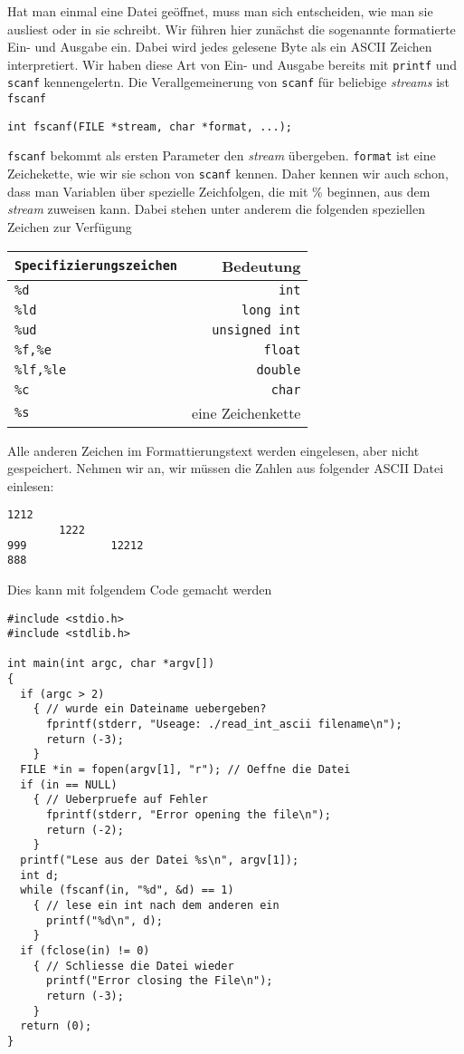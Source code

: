 Hat man einmal eine Datei geöffnet, muss man sich entscheiden, wie man sie ausliest oder in sie schreibt.
Wir führen hier zunächst die sogenannte formatierte Ein- und Ausgabe ein.
Dabei wird jedes gelesene Byte als ein ASCII Zeichen interpretiert.
Wir haben diese Art von Ein- und Ausgabe bereits mit \verb|printf| und \verb|scanf| kennengelertn.
Die Verallgemeinerung von \verb|scanf| für beliebige \emph{streams} ist \verb|fscanf|
\begin{lstlisting}
int fscanf(FILE *stream, char *format, ...);
\end{lstlisting}
\verb|fscanf| bekommt als ersten Parameter den \emph{stream} übergeben.
\verb|format| ist eine Zeichekette, wie wir sie schon von \verb|scanf| kennen.
Daher kennen wir auch schon, dass man Variablen über spezielle Zeichfolgen, die mit \% beginnen, aus dem \emph{stream} zuweisen kann.
Dabei stehen unter anderem die folgenden speziellen Zeichen zur Verfügung
\begin{center}
  \begin{tabular}{lr}
    \hline
    \texttt{Specifizierungszeichen} & Bedeutung \\\hline
    \texttt{\%d}	&  \texttt{int} \\
    \texttt{\%ld}  &  \texttt{long int} \\
    \texttt{\%ud}  &  \texttt{unsigned int} \\
    \texttt{\%f,\%e}   & \texttt{float} \\
    \texttt{\%lf,\%le}  & \texttt{double} \\
    \texttt{\%c}  & \texttt{char} \\
    \texttt{\%s}  & eine Zeichenkette\\
    \hline
  \end{tabular}
\end{center}
Alle anderen Zeichen im Formattierungstext werden eingelesen, aber nicht gespeichert. 
Nehmen wir an, wir müssen die Zahlen aus folgender ASCII Datei einlesen:
\begin{lstlisting}
1212
        1222
999             12212
888
\end{lstlisting}
Dies kann mit folgendem Code gemacht werden
\begin{lstlisting}
#include <stdio.h>
#include <stdlib.h>

int main(int argc, char *argv[])
{
  if (argc > 2)
    { // wurde ein Dateiname uebergeben?
      fprintf(stderr, "Useage: ./read_int_ascii filename\n");
      return (-3);
    }
  FILE *in = fopen(argv[1], "r"); // Oeffne die Datei
  if (in == NULL)
    { // Ueberpruefe auf Fehler
      fprintf(stderr, "Error opening the file\n");
      return (-2);
    }
  printf("Lese aus der Datei %s\n", argv[1]);
  int d;
  while (fscanf(in, "%d", &d) == 1)
    { // lese ein int nach dem anderen ein
      printf("%d\n", d);
    }
  if (fclose(in) != 0)
    { // Schliesse die Datei wieder
      printf("Error closing the File\n");
      return (-3);
    }
  return (0);
}
\end{lstlisting}
